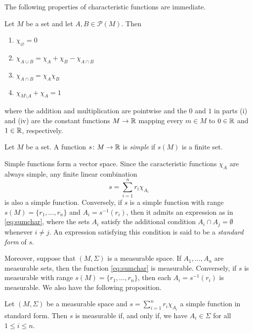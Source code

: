 The following properties of characteristic functions are immediate.
\begin{proposition}
\label{prp:characteristic}
Let $M$ be a set and let $A,B\in\mathscr{P}(M)$. Then
\begin{enumerate}[label=(\roman*)]
\item $\chi_{\varnothing}=0$
\item $\chi_{A\cup B} = \chi_A+\chi_B-\chi_{A\cap B}$
\item $\chi_{A\cap B} = \chi_A\chi_B$
\item $\chi_{M\setminus A} + \chi_A = 1$
\end{enumerate}
where the addition and multiplication are pointwise and the $0$ and
$1$ in parts (i) and (iv) are the constant functions $M\to \mathbb{R}$ mapping
every $m\in M$ to $0\in\mathbb{R}$ and $1\in\mathbb{R}$, respectively.
\end{proposition}

\begin{definition}
Let $M$ be a set. A function $s\colon M \to \mathbb{R}$ is
\emph{simple} if $s(M)$ is a finite set.
\end{definition}

Simple functions form a vector space. Since the caracteristic
functions \(\chi_A\) are always simple, any finite linear combination
\begin{equation}
  \label{eq:sumchar}
  s = \sum_{i=1}^nr_i\chi_{A_i}
\end{equation}
is also a simple function.
Conversely, if \(s\) is a simple function with range
\(s(M)=\{r_1,\dots,r_n\}\) and \(A_i=s^{-1}(r_i)\), then it admits an
expression as in \eqref{eq:sumchar},
where the sets \(A_i\) satisfy the additional condition
\(A_i\cap A_j=\emptyset\) whenever \(i\neq j\).
An expression satisfying this condition is said to be a \emph{standard
form} of \(s\).

Moreover, suppose that \((M,\Sigma)\) is a measurable space.
If \(A_1,\dots,A_n\) are measurable sets, then the function
\eqref{eq:sumchar} is measurable. Conversely, if \(s\) is measurable
with range \(s(M)=\{r_1,\dots,r_n\}\), then each \(A_i=s^{-1}(r_i)\)
is measurable. We also have the following proposition.

\begin{proposition}
Let $(M,\Sigma)$ be a measurable space and $s=\sum_{i=1}^n r_i
\chi_{A_i}$ a simple function in standard form.
Then $s$ is measurable if, and only if, we have $A_i\in \Sigma$ for
all $1\leq i\leq n$.
\end{proposition}

